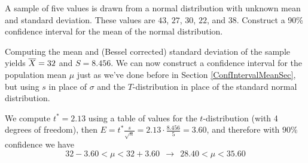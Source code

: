 \begin{examp}\label{TIntExample} A sample of five values is drawn from a normal distribution with unknown mean and standard deviation. These values are $43$, $27$, $30$, $22$, and $38$. Construct a 90\% confidence interval for the mean of the normal distribution.
\par
\noindent Computing the mean and (Bessel corrected) standard deviation of the sample yields ${\overline{X}} = 32$ and $S = 8.456$. We can now construct a confidence interval for the population mean $\mu$ just as we've done before in Section \ref{ConfIntervalMeanSec}, but using $s$ in place of $\sigma$ and the $T$-distribution in place of the standard normal distribution.
\begin{center}
\end{center}
\noindent We compute $t^* = 2.13$ using a table of values for the $t$-distribution (with 4 degrees of freedom), then $E = t^{*} \frac{s}{\sqrt{n}} = 2.13 \cdot \frac{8.456}{5} = 3.60$, and therefore with $90\%$ confidence we have
$$32 - 3.60 < \mu < 32 + 3.60 \ \ \rightarrow \ \ 28.40 < \mu < 35.60$$
\end{examp}

